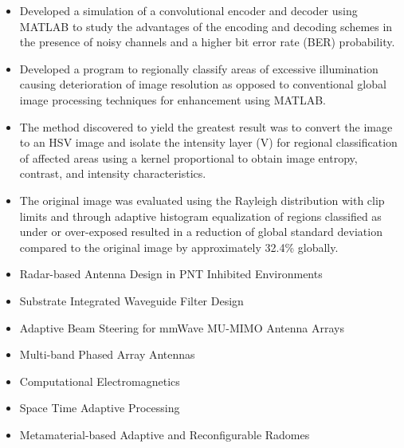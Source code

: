 \documentclass[10pt,a4paper]{altacv}
\begin{document}
\begin{itemize}
    \item Developed a simulation of a convolutional encoder and decoder using MATLAB to study the advantages of the encoding and decoding schemes in the presence of noisy channels and a higher bit error rate (BER) probability.
\end{itemize}
\divider
\medskip

\begin{itemize}
    \item Developed a program to regionally classify areas of excessive illumination causing deterioration of image resolution as opposed to conventional global image processing techniques for enhancement using MATLAB.
    \item The method discovered to yield the greatest result was to convert the image to an HSV image and isolate the intensity layer (V) for regional classification of affected areas using a kernel proportional to obtain image entropy, contrast, and intensity characteristics.
    \item The original image was evaluated using the Rayleigh distribution with clip limits and through adaptive histogram equalization of regions classified as under or over-exposed resulted in a reduction of global standard deviation compared to the original image by approximately 32.4\% globally. 
\end{itemize}
\divider

\begin{itemize}
    \item Radar-based Antenna Design in PNT Inhibited Environments
    \item Substrate Integrated Waveguide Filter Design
    \item Adaptive Beam Steering for mmWave MU-MIMO Antenna Arrays
    \item Multi-band Phased Array Antennas
    \item Computational Electromagnetics
    \item Space Time Adaptive Processing
    \item Metamaterial-based Adaptive and Reconfigurable Radomes
\end{itemize}

\medskip


\clearpage




\end{document}
